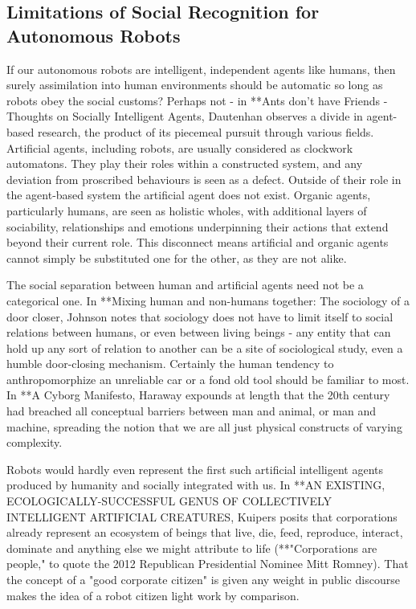\documentclass{sfuthesis}
\begin{document}
\subsection{Limitations of Social Recognition for Autonomous Robots}

If our autonomous robots are intelligent, independent agents like humans, then surely assimilation into human environments should be automatic so long as robots obey the social customs? Perhaps not - in **Ants don't have Friends - Thoughts on Socially Intelligent Agents, Dautenhan observes a divide in agent-based research, the product of its piecemeal pursuit through various fields. Artificial agents, including robots, are usually considered as clockwork automatons. They play their roles within a constructed system, and any deviation from proscribed behaviours is seen as a defect. Outside of their role in the agent-based system the artificial agent does not exist. Organic agents, particularly humans, are seen as holistic wholes, with additional layers of sociability, relationships and emotions underpinning their actions that extend beyond their current role. This disconnect means artificial and organic agents cannot simply be substituted one for the other, as they are not alike.

The social separation between human and artificial agents need not be a categorical one. In **Mixing human and non-humans together: The sociology of a door closer, Johnson notes that sociology does not have to limit itself to social relations between humans, or even between living beings - any entity that can hold up any sort of relation to another can be a site of sociological study, even a humble door-closing mechanism. Certainly the human tendency to anthropomorphize an unreliable car or a fond old tool should be familiar to most. In **A Cyborg Manifesto, Haraway expounds at length that the 20th century had breached all conceptual barriers between man and animal, or man and machine, spreading the notion that we are all just physical constructs of varying complexity.

Robots would hardly even represent the first such artificial intelligent agents produced by humanity and socially integrated with us. In **AN EXISTING, ECOLOGICALLY-SUCCESSFUL GENUS OF COLLECTIVELY INTELLIGENT ARTIFICIAL CREATURES, Kuipers posits that corporations already represent an ecosystem of beings that live, die, feed, reproduce, interact, dominate and anything else we might attribute to life (**"Corporations are people," to quote the 2012 Republican Presidential Nominee Mitt Romney). That the concept of a "good corporate citizen" is given any weight in public discourse makes the idea of a robot citizen light work by comparison.
\end{document}
